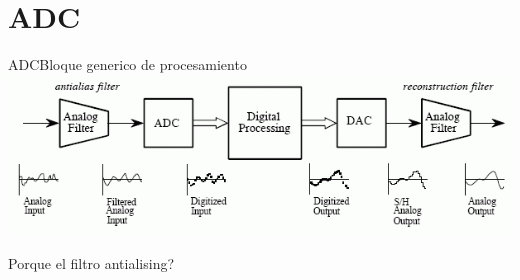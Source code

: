 \section{ADC}
\begin{frame}{ADC}{Bloque generico de procesamiento}
   \center\includegraphics[width=1\textwidth]{1_clase/adc_dac}
   \begin{alertblock} {Porque el filtro antialising?}
   \end{alertblock}
   \vfill
\end{frame}

